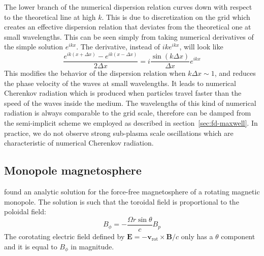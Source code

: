 The lower branch of the numerical dispersion relation curves down with
respect to the theoretical line at high $k$. This is due to discretization on the
grid which creates an effective dispersion relation that deviates from
the theoretical one at small wavelengths. This can be seen simply from taking numerical derivatives of the simple solution $e^{ikx}$. The derivative, instead of $ike^{ikx}$, will look like
\begin{equation}
    \frac{e^{ik(x+\Delta x)} - e^{ik(x-\Delta x)}}{2\Delta x} = i\frac{\sin(k\Delta x)}{\Delta x} e^{ikx}
\end{equation}
This modifies the behavior of the dispersion relation when $k\Delta x \sim 1$,
and reduces the phase velocity of the waves at small wavelengths. It leads to
numerical Cherenkov radiation which is produced when particles travel faster
than the speed of the waves inside the medium. The wavelengths of this kind of
numerical radiation is always comparable to the grid scale, therefore can be
damped from the semi-implicit scheme we employed as described in
section~\ref{sec:fd-maxwell}. In practice, we do not observe strong sub-plasma
scale oscillations which are characteristic of numerical Cherenkov radiation.


\subsection{Monopole magnetosphere}
\label{sec:test-monopole}

\citet{michel_rotating_1973} found an analytic solution for the force-free
magnetosphere of a rotating magnetic monopole. The solution is such that the
toroidal field is proportional to the poloidal field:
\begin{equation}
  \label{eq:monopole-toroidal}
  B_{\phi} = -\frac{\Omega r\sin\theta}{c} B_{p}
\end{equation}
The corotating electric field defined by $\mathbf{E} =
-\mathbf{v}_\mathrm{rot}\times \mathbf{B}/c$ only has a $\theta$ component and it
is equal to $B_{\phi}$ in magnitude.

